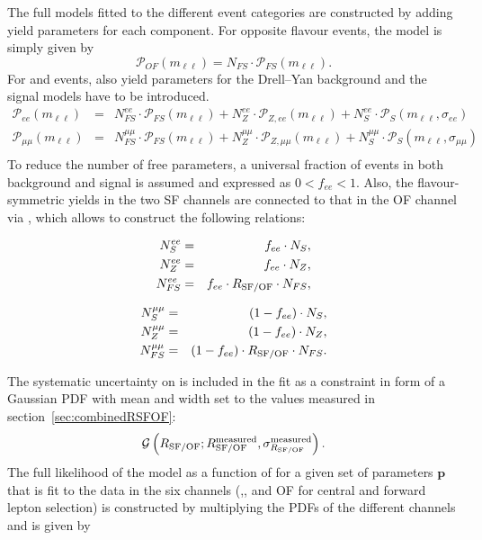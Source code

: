 The full models fitted to the different event categories are constructed by adding yield parameters for each component. For opposite flavour events, the model is simply given by 
\begin{equation*}
 \mathcal{P}_{OF}(m_{\ell\ell}) = N_{FS} \cdot \mathcal{P}_{FS}(m_{\ell\ell}).
\end{equation*}
For \EE and \MM events, also yield parameters for the Drell--Yan background and the signal models have to be introduced. 
\begin{eqnarray*}
 {\mathcal{P}}_{ee}(m_{\ell\ell})     & = &  N_{FS}^{ee} \cdot {\mathcal{P}}_{FS}(m_{\ell\ell})      +  N_{Z}^{ee} \cdot {\mathcal{P}}_{Z,ee}(m_{\ell\ell})           +   N_{S}^{ee} \cdot  {\mathcal{P}}_{S}(m_{\ell\ell},\sigma_{ee}) \\
 {\mathcal{P}}_{\mu\mu}(m_{\ell\ell}) & = &   N_{FS}^{\mu\mu} \cdot {\mathcal{P}}_{FS}(m_{\ell\ell})  +  N_{Z}^{\mu\mu} \cdot {\mathcal{P}}_{Z,\mu\mu}(m_{\ell\ell})   +   N_{S}^{\mu\mu} \cdot {\mathcal{P}}_{S}(m_{\ell\ell},\sigma_{\mu\mu}) \\
\end{eqnarray*}
To reduce the number of free parameters, a universal fraction of \EE events in both background and signal is assumed and expressed as $0 < f_{ee} < 1$. Also, the flavour-symmetric yields in the two SF channels are connected to that in the OF channel via \Rsfof, which allows to construct the following relations:
\begin{center}
  \begin{minipage}[t]{0.49\textwidth}
\begin{eqnarray*}
 N_{S}^{ee} &=& f_{ee} \cdot N_{S}, \\
  N_{Z}^{ee} &=& f_{ee} \cdot N_{Z},\\
    N_{FS}^{ee} &=& f_{ee} \cdot R_{\text{SF/OF}} \cdot N_{FS}, \\
\end{eqnarray*}
  \end{minipage}
  \begin{minipage}[t]{0.49\textwidth}
\begin{eqnarray*}
 N_{S}^{\mu\mu} &=& (1-f_{ee}) \cdot N_{S}, \\
  N_{Z}^{\mu\mu} &=& (1-f_{ee}) \cdot N_{Z}, \\
    N_{FS}^{\mu\mu} &=& (1-f_{ee}) \cdot R_{\text{SF/OF}} \cdot N_{FS}. \\
\end{eqnarray*}
  \end{minipage}
\end{center}
The systematic uncertainty on \Rsfof is included in the fit as a constraint in form of a Gaussian PDF with mean and width set to the values measured in section~\ref{sec:combinedRSFOF}:
\begin{equation*}
{\mathcal{G}}\left(R_{\text{SF/OF}};R_{\text{SF/OF}}^{\text{measured}},\sigma_{R_{\text{SF/OF}}}^{\text{measured}}\right).
\end{equation*}
The full likelihood of the model as a function of \mll for a given set of parameters $\mathbf{p}$ that is fit to the data in the six channels (\EE,\MM, and OF for central and forward lepton selection) is constructed by multiplying the PDFs of the different channels and is given by

